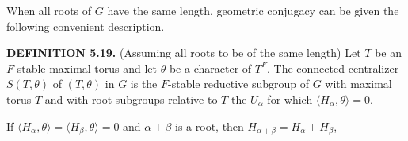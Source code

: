 \documentclass[9pt,twoside]{extarticle}
\begin{document}
{When all roots of \(G\) have the same length, geometric conjugacy can be given the following convenient description.\par

\noindent\textbf{DEFINITION 5.19.} (Assuming all roots to be of the same length) Let \(T\) be an \(F\)-stable maximal torus and let \(\theta\) be a character of \(T^F\). The connected centralizer \(S(T,\theta)\) of \((T,\theta)\) in \(G\) is the \(F\)-stable reductive subgroup of \(G\) with maximal torus \(T\) and with root subgroups relative to \(T\) the \(U_\alpha\) for which \(\langle H_\alpha,\theta\rangle=0\).\par

If \(\langle H_\alpha,\theta\rangle=\langle H_\beta,\theta\rangle=0\) and \(\alpha+\beta\) is a root, then \(H_{\alpha+\beta}=H_\alpha+H_\beta\),\par
}
\end{document}
